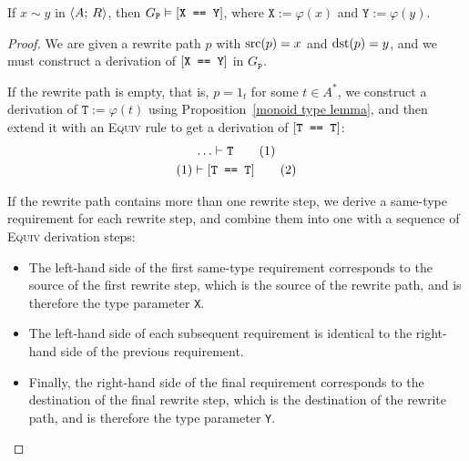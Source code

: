 \documentclass[../generics]{subfiles}
\begin{document}
\begin{theorem}\label{path to derivation}
If $x\sim y$ in $\langle A;\,R\rangle$, then $G_\texttt{P}\vDash[\texttt{X == Y}]$, where $\texttt{X}:=\varphi(x)$ and $\texttt{Y}:=\varphi(y)$.
\end{theorem}
\begin{proof}
We are given a rewrite path $p$ with $\operatorname{src}(p)=x$ and $\operatorname{dst}(p)=y$, and we must construct a derivation of $[\texttt{X == Y}]$ in $G_\texttt{P}$.

If the rewrite path is empty, that is, $p=1_t$ for some $t\in A^*$, we construct a derivation of $\texttt{T}:=\varphi(t)$ using Proposition~\ref{monoid type lemma}, and then extend it with an \textsc{Equiv} rule to get a derivation of $[\texttt{T == T}]$:
\begin{gather*}
\ldots\vdash\texttt{T}\tag{1}\\
(1)\vdash[\texttt{T == T}]\tag{2}
\end{gather*}

If the rewrite path contains more than one rewrite step, we derive a same-type requirement for each rewrite step, and combine them into one with a sequence of \textsc{Equiv} derivation steps:
\begin{itemize}
\item The left-hand side of the first same-type requirement corresponds to the source of the first rewrite step, which is the source of the rewrite path, and is therefore the type parameter \texttt{X}.
\item The left-hand side of each subsequent requirement is identical to the right-hand side of the previous requirement.
\item Finally, the right-hand side of the final requirement corresponds to the destination of the final rewrite step, which is the destination of the rewrite path, and is therefore the type parameter \texttt{Y}.
\end{itemize}


\end{proof}
\end{document}
